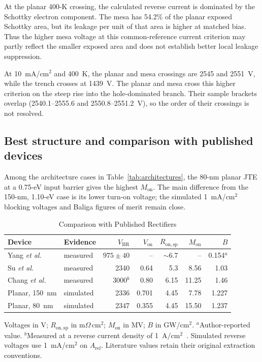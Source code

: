 \documentclass[journal,10pt]{IEEEtran}
\newcommand{\Ron}{\ensuremath{R_{\mathrm{on,sp}}}}
\begin{document}
At the planar 400-K crossing, the calculated reverse current is dominated by the Schottky electron component. The mesa has 54.2\% of the planar exposed Schottky area, but its leakage per unit of that area is higher at matched bias. Thus the higher mesa voltage at this common-reference current criterion may partly reflect the smaller exposed area and does not establish better local leakage suppression.

At 10~mA/cm$^2$ and 400~K, the planar and mesa crossings are 2545 and 2551~V, while the trench crosses at 1439~V. The planar and mesa cross this higher criterion on the steep rise into the hole-dominated branch. Their sample brackets overlap (2540.1--2555.6 and 2550.8--2551.2~V), so the order of their crossings is not resolved.
\clearpage
\subsection{Best structure and comparison with published devices}
Among the architecture cases in Table~\ref{tab:architectures}, the 80-nm planar JTE at a 0.75-eV input barrier gives the highest $M_{\mathrm{on}}$. The main difference from the 150-nm, 1.10-eV case is its lower turn-on voltage; the simulated 1~mA/cm$^2$ blocking voltages and Baliga figures of merit remain close.

\begin{table}[!ht]
\caption{Comparison with Published Rectifiers}
\label{tab:literature}
\centering\scriptsize
\setlength{\tabcolsep}{1.5pt}
\begin{tabular}{>{\raggedright\arraybackslash}p{1.30cm}lrrrrr}
\toprule
Device & Evidence & $V_{\mathrm{BR}}$ & $V_{\mathrm{on}}$ & $\Ron$ & $M_{\mathrm{on}}$ & $B$\\
\midrule
Yang \emph{et al.}~\cite{Yang2017} & measured & $975\pm40$ & -- & $\sim$6.7 & -- & 0.154$^{a}$\\
Su \emph{et al.}~\cite{Su2024_APL} & measured & 2340 & 0.64 & 5.3 & 8.56 & 1.03\\
Chang \emph{et al.}~\cite{Chang2025_APL} & measured & 3000$^{b}$ & 0.80 & 6.15 & 11.25 & 1.46\\
Planar, 150~nm & simulated & 2336 & 0.701 & 4.45 & 7.78 & 1.227\\
Planar, 80~nm & simulated & 2347 & 0.355 & 4.45 & 15.50 & 1.237\\
\bottomrule
\end{tabular}
\par\smallskip\begin{minipage}{0.98\columnwidth}\footnotesize
Voltages in V; $\Ron$ in m$\Omega$\,cm$^2$; $M_{\mathrm{on}}$ in MV; $B$ in GW/cm$^2$. $^{a}$Author-reported value. $^{b}$Measured at a reverse current density of 1~A/cm$^2$~\cite{Chang2025_APL}. Simulated reverse voltages use 1~mA/cm$^2$ on $A_{\mathrm{ref}}$. Literature values retain their original extraction conventions.
\end{minipage}
\end{table}
\end{document}

